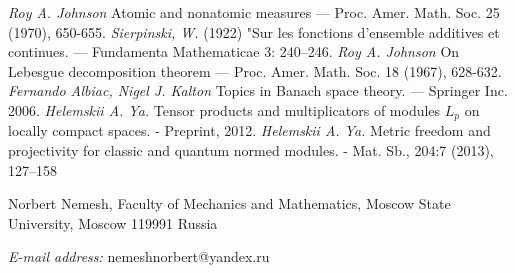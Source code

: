 \documentclass[12pt]{article}
\begin{document}
\begin{thebibliography}{999}
\textit{Roy A. Johnson} Atomic and nonatomic measures —  Proc. Amer. Math. Soc. 25 (1970), 650-655.
\textit{Sierpinski, W.} (1922) "Sur les fonctions d'ensemble additives et continues. — Fundamenta Mathematicae 3: 240–246.
\textit{Roy A. Johnson} On Lebesgue decomposition theorem — Proc. Amer. Math. Soc. 18 (1967), 628-632.
\textit{Fernando Albiac, Nigel J. Kalton} Topics in Banach space theory. — Springer Inc. 2006.
\textit{Helemskii A. Ya.} Tensor products and multiplicators of modules $L_p$ on locally compact spaces. - Preprint, 2012.
\textit{Helemskii A. Ya.} Metric freedom and projectivity for classic and quantum normed modules. - Mat. Sb., 204:7 (2013), 127–158
\end{thebibliography}



Norbert Nemesh, Faculty of Mechanics and Mathematics, Moscow State University, Moscow 119991 Russia

\textit{E-mail address:} nemeshnorbert@yandex.ru
\end{document}
